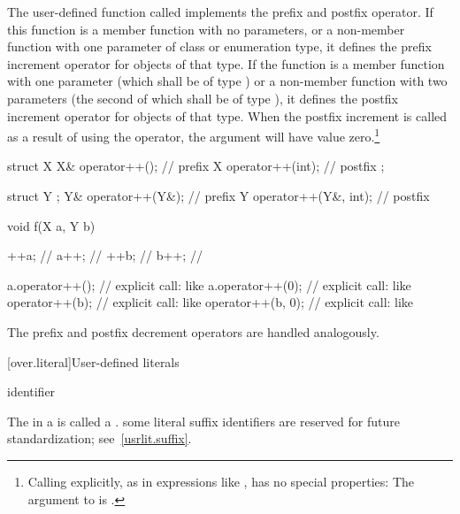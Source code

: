 \pnum
The user-defined function called
implements the prefix and postfix
\tcode{++}
operator.
If this function is a member function with no parameters, or a non-member
function with one parameter of class or enumeration type,
it defines the prefix increment operator
\tcode{++}
for objects of that type.
If the function is a member function with one parameter (which shall be of type
)
or a non-member function with two parameters (the second of which shall be of type
),
it defines the postfix increment operator
\tcode{++}
for objects of that type.
When the postfix increment is called as a result of using the
\tcode{++}
operator, the
argument will have value zero.\footnote{Calling
explicitly, as in expressions like
,
has no special properties:
The argument to
is
.}
\enterexample

\begin{codeblock}
struct X {
  X&   operator++();            // prefix 
  X    operator++(int);         // postfix 
};

struct Y { };
Y&   operator++(Y&);            // prefix 
Y    operator++(Y&, int);       // postfix 

void f(X a, Y b) {
  ++a;                          // 
  a++;                          // 
  ++b;                          // 
  b++;                          // 

  a.operator++();               // explicit call: like 
  a.operator++(0);              // explicit call: like 
  operator++(b);                // explicit call: like 
  operator++(b, 0);             // explicit call: like 
}
\end{codeblock}
\exitexample

\pnum
The prefix and postfix decrement operators
\tcode{-{-}}
are handled analogously.

[over.literal]{User-defined literals}%
%

\begin{bnf}
\br
      identifier
\end{bnf}

\pnum
The  in a  is called a
.
\enternote some literal suffix identifiers are reserved for future standardization;
see~\ref{usrlit.suffix}. \exitnote

